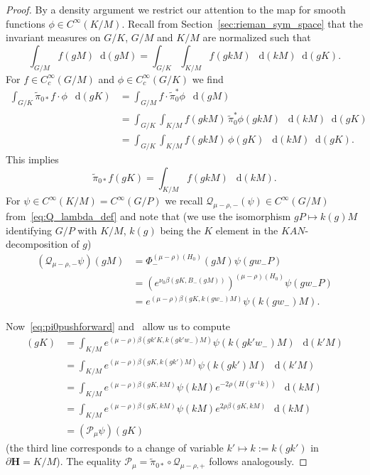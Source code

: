 \documentclass[10pt]{amsart}
\theoremstyle{definition}
\newcommand{\bfh}{\mathbf{H}}
\newcommand{\pl}{\partial}
\newcommand{\til}{\widetilde}
\newcommand{\intd}{\mathop{}\!\mathrm{d}}
\begin{document}
\begin{proof}
By a density argument we restrict our attention to the map for smooth functions $\phi\in C^\infty(K/M)$. Recall from Section~\ref{sec:rieman_sym_space} that the invariant measures on $G/K$, $G/M$ and $K/M$ are normalized such that
\[
\int_{G/M}f(gM) \intd (gM) = \int_{G/K}\int_{K/M} f(gkM)~\intd (kM)\intd (gK).
\]
For $f\in C^\infty_c(G/M)$ and $\phi\in C^\infty_c(G/K)$ we find
\begin{align*}
\int_{G/K}\til\pi_{0*}f\cdot \phi~\intd (gK) &=\int_{G/M}f\cdot \til\pi_{0}^*\phi~\intd (gM)\\
&=\int_{G/K}\int_{K/M}f(gkM)\, \til\pi_{0}^*\phi(gkM)~\intd (kM) \intd (gK)\\
&=\int_{G/K}\int_{K/M}f(gkM)\, \phi(gK)~\intd (kM) \intd (gK).
\end{align*}
This implies
\begin{equation}\label{eq:pi0pushforward}
\til\pi_{0*}f(gK)=\int_{K/M}f(gkM)~\intd (kM).
\end{equation}
For $\psi\in C^\infty(K/M)=C^\infty(G/P)$ we recall $\mathcal Q_{\mu-\rho,-}(\psi)\in C^\infty(G/M)$ from~\eqref{eq:Q_lambda_def} and note that (we use the isomorphism $gP\mapsto k(g)M$ identifying $G/P$ with $K/M$, $k(g)$ being the $K$ element in the $KAN$-decomposition of $g$)
\begin{align*}
(\mathcal Q_{\mu-\rho,-}\psi)(gM) &=\Phi_-^{(\mu-\rho)(H_0)}(gM)\psi(gw_-P)\\
&=\left(e^{\nu_0\beta(gK,B_-(gM))}\right)^{(\mu-\rho)(H_0)}\psi(gw_-P)\\
&=e^{(\mu-\rho)\beta(gK, k(gw_-)M)}\psi(k(gw_-)M).
\end{align*}

Now~\eqref{eq:pi0pushforward} and~\cite[Lemma~I.5.19]{Hel84} allow us to compute
\begin{align*}
[(\til{\pi}_{0*} \circ \mathcal Q_{\mu-\rho, -}) \psi](gK) &= \int_{K/M} e^{(\mu-\rho)\beta(gk'K, k(gk'w_-)M)} \psi(k(gk'w_-)M)~\intd (k'M)\\
&= \int_{K/M} e^{(\mu-\rho)\beta(gK, k(gk')M)} \psi(k(gk')M)~\intd (k'M)\\
&= \int_{K/M} e^{(\mu-\rho)\beta(gK, kM)} \psi(kM)e^{-2\rho(H(g^{-1}k))}~\intd (kM)\\
&= \int_{K/M} e^{(\mu-\rho)\beta(gK, kM)} \psi(kM)e^{2\rho\beta(gK, kM)}~\intd (kM)\\
&= (\mathcal P_\mu\psi)(gK)
\end{align*}
(the third line corresponds to a change of variable $k'\mapsto k:=k(gk')$ in $\pl {\bfh}=K/M$). The equality $\mathcal P_\mu = \til{\pi}_{0*} \circ \mathcal Q_{\mu-\rho, +}$ follows analogously.
\end{proof}
\end{document}
